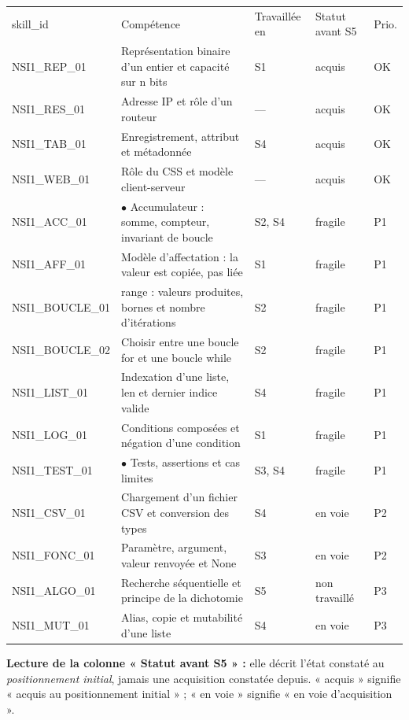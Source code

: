 \documentclass[10pt,a4paper]{article}
\begin{document}
\par\noindent\begin{tabularx}{\linewidth}{>{\ttfamily\scriptsize}p{27mm} X >{\scriptsize}p{16mm} >{\scriptsize}p{20mm} >{\scriptsize\centering\arraybackslash}p{9mm}}
\rowcolor{Navy}\color{white}\scriptsize skill\_id & \color{white}Compétence & \color{white}Travaillée en & \color{white}Statut avant S5 & \color{white}Prio. \\
NSI1\_REP\_01 & Représentation binaire d'un entier et capacité sur n bits & S1 & acquis & OK \\
NSI1\_RES\_01 & Adresse IP et rôle d'un routeur & --- & acquis & OK \\
NSI1\_TAB\_01 & Enregistrement, attribut et métadonnée & S4 & acquis & OK \\
NSI1\_WEB\_01 & Rôle du CSS et modèle client-serveur & --- & acquis & OK \\
NSI1\_ACC\_01 & $\bullet$ Accumulateur : somme, compteur, invariant de boucle & S2, S4 & fragile & P1 \\
NSI1\_AFF\_01 & Modèle d'affectation : la valeur est copiée, pas liée & S1 & fragile & P1 \\
NSI1\_BOUCLE\_01 & range : valeurs produites, bornes et nombre d'itérations & S2 & fragile & P1 \\
NSI1\_BOUCLE\_02 & Choisir entre une boucle for et une boucle while & S2 & fragile & P1 \\
NSI1\_LIST\_01 & Indexation d'une liste, len et dernier indice valide & S4 & fragile & P1 \\
NSI1\_LOG\_01 & Conditions composées et négation d'une condition & S1 & fragile & P1 \\
NSI1\_TEST\_01 & $\bullet$ Tests, assertions et cas limites & S3, S4 & fragile & P1 \\
NSI1\_CSV\_01 & Chargement d'un fichier CSV et conversion des types & S4 & en voie & P2 \\
NSI1\_FONC\_01 & Paramètre, argument, valeur renvoyée et None & S3 & en voie & P2 \\
NSI1\_ALGO\_01 & Recherche séquentielle et principe de la dichotomie & S5 & non travaillé & P3 \\
NSI1\_MUT\_01 & Alias, copie et mutabilité d'une liste & S4 & en voie & P3 \\
\end{tabularx}
\par\vspace{1mm}\small\textbf{Lecture de la colonne « Statut avant S5 » :} elle décrit l'état constaté au \emph{positionnement initial}, jamais une acquisition constatée depuis. « acquis » signifie « acquis au positionnement initial » ; « en voie » signifie « en voie d'acquisition ».
\end{document}
